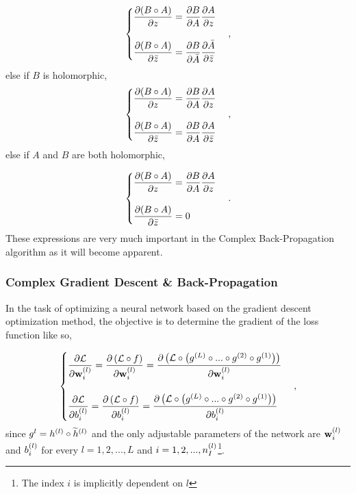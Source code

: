 \begin{equation}
	\begin{cases}
		\dfrac{\partial (B \circ A)}{\partial z} = \dfrac{\partial B}{\partial A}\dfrac{\partial A}{\partial z} \\
		\\
		\dfrac{\partial (B \circ A)}{\partial \bar{z}} = \dfrac{\partial B}{\partial \bar{A}}\dfrac{\partial \bar{A}}{\partial \bar{z}} \\
	\end{cases},
\end{equation}
else if $ B $ is holomorphic,
\begin{equation}
	\begin{cases}
		\dfrac{\partial (B \circ A)}{\partial z} = \dfrac{\partial B}{\partial A}\dfrac{\partial A}{\partial z} \\
		\\
		\dfrac{\partial (B \circ A)}{\partial \bar{z}} = \dfrac{\partial B}{\partial A}\dfrac{\partial A}{\partial \bar{z}} \\
	\end{cases},
	\label{eq:B_holo}
\end{equation}
else if $ A $ and $ B $ are both holomorphic,

\begin{equation}
	\begin{cases}
		\dfrac{\partial (B \circ A)}{\partial z} = \dfrac{\partial B}{\partial A}\dfrac{\partial A}{\partial z} \\
		\\
		\dfrac{\partial (B \circ A)}{\partial \bar{z}} = 0 \\
	\end{cases}.
\end{equation}
These expressions are very much important in the Complex Back-Propagation algorithm as it will become apparent.

\subsubsection{Complex Gradient Descent \& Back-Propagation}
In the task of optimizing a neural network based on the gradient descent optimization method, the objective is to determine the gradient of the loss function like so,

\begin{equation}
	\begin{cases}
		\dfrac{\partial \mathcal{L}}{\partial \mathbf{w}^{(l)}_{i}}  = \dfrac{\partial \left( \mathcal{L} \circ f \right)}{\partial \mathbf{w}^{(l)}_{i}} = 
		\dfrac{\partial \left( \mathcal{L} \circ \left( g^{(L)} \circ ... \circ g^{(2)} \circ g^{(1)} \right) \right)}{\partial \mathbf{w}^{(l)}_{i}} \\
		\\
		\dfrac{\partial \mathcal{L}}{\partial b^{(l)}_{i}}  = \dfrac{\partial \left( \mathcal{L} \circ f \right)}{\partial b^{(l)}_{i}} = 
		\dfrac{\partial \left( \mathcal{L} \circ \left( g^{(L)} \circ ... \circ g^{(2)} \circ g^{(1)} \right) \right)}{\partial b^{(l)}_{i}} \\
	\end{cases},
\end{equation}
since $ g^{l} = h^{(l)} \circ \widetilde{h}^{(l)} $ and the only adjustable parameters of the network are $ \mathbf{w}^{(l)}_{i} $ and $ b^{(l)}_{i} $ for every $ l = 1, 2, ..., L $ and $ i = 1, 2, ..., n^{(l)}_{I} $\footnote{The index $ i $ is implicitly dependent on $ l $}.

